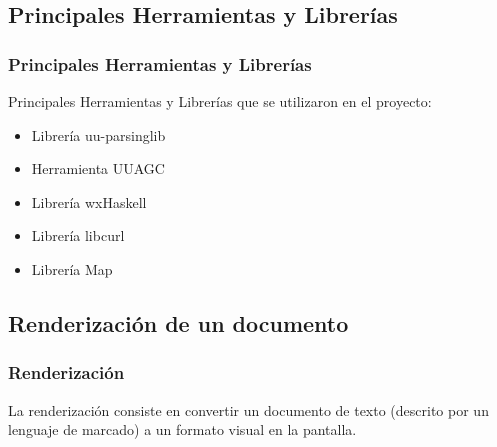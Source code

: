 \documentclass[12pt]{beamer}
\begin{document}
\subsection{Principales Herramientas y Librerías}
\begin{frame}
\frametitle{Principales Herramientas y Librerías}
Principales Herramientas y Librerías que se utilizaron en el proyecto:

\begin{itemize}
	\item Librería uu-parsinglib
	\item Herramienta UUAGC
	\item Librería wxHaskell
	\item Librería libcurl
	\item Librería Map
\end{itemize}
\end{frame}

\subsection{Renderización de un documento}

\begin{frame}
\frametitle{Renderización}
La renderización consiste en convertir un documento de texto (descrito por un
lenguaje de marcado) a un formato visual en la pantalla.

\begin{figure}
\end{figure}
\end{frame}
\end{document}
